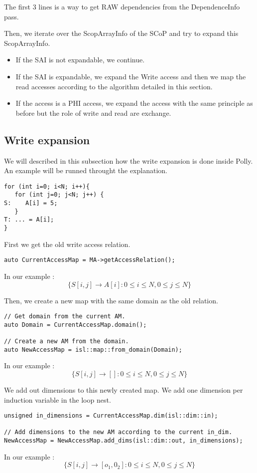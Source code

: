 The first 3 lines is a way to get RAW dependencies from the DependenceInfo pass.

Then, we iterate over the ScopArrayInfo of the SCoP and try to expand this ScopArrayInfo.
\begin{itemize}
\item If the SAI is not expandable, we continue.
\item If the SAI is expandable, we expand the Write access and then we map the read accesses according to the algorithm detailed in this section.
\item If the access is a PHI access,  we expand the access with the same principle as before but the role of write and read are exchange.
\end{itemize}

\subsection{Write expansion}
We will described in this subsection how the write expansion is done inside Polly. An example will be runned throught the explanation. 
\begin{lstlisting}[frame=single]
for (int i=0; i<N; i++){
   for (int j=0; j<N; j++) {
S:    A[i] = 5;
   }
T: ... = A[i];
}
\end{lstlisting}

First we get the old write access relation.
\begin{lstlisting}[frame=single]
auto CurrentAccessMap = MA->getAccessRelation();
\end{lstlisting}
In our example :
\[
\{ S[i, j] \rightarrow A[i] : 0 \le i \le N, 0 \le j \le N\}
\]

Then, we create a new map with the same domain as the old relation.
\begin{lstlisting}[frame=single]
// Get domain from the current AM.
auto Domain = CurrentAccessMap.domain();

// Create a new AM from the domain.
auto NewAccessMap = isl::map::from_domain(Domain);
\end{lstlisting}
In our example :
\[
\{ S[i, j] \rightarrow [] : 0 \le i \le N, 0 \le j \le N\}
\]

We add out dimensions to this newly created map. We add one dimension per induction variable in the loop nest.
\begin{lstlisting}[frame=single]
unsigned in_dimensions = CurrentAccessMap.dim(isl::dim::in);

// Add dimensions to the new AM according to the current in_dim.
NewAccessMap = NewAccessMap.add_dims(isl::dim::out, in_dimensions);
\end{lstlisting}
In our example :
\[
\{ S[i, j] \rightarrow [o_1, 0_2] : 0 \le i \le N, 0 \le j \le N\}
\]

